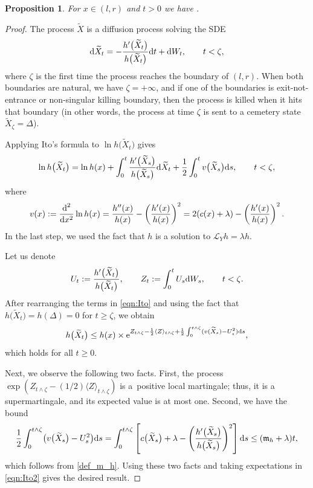\documentclass[pdftex]{sigma}
\numberwithin{equation}{section}
\newtheorem{Proposition}[Theorem]{Proposition}
\theoremstyle{definition}
\def\L{{\mathcal L}}
\def\e{{\mathbb E}}
\def\d{{\textnormal d}}
\begin{document}
\begin{Proposition}\label{prop_excessive}
For $x\in (l,r)$ and $t>0$ we have \smash{$\e_x\big[ h\bigl(\widetilde X_t\bigr)\big] \le {\rm e}^{ ({\mathfrak m}_h + \lambda) t} h(x) $}.
\end{Proposition}
\begin{proof}
The process $\widetilde X$ is a diffusion process solving the SDE
\[
\d \widetilde X_t=-\frac{h'\bigl(\widetilde X_t\bigr)}{h\bigl(\widetilde X_t\bigr)} \d t + \d W_t, \qquad t<\zeta,
\]
where $\zeta$ is the first time the process reaches the boundary of $(l,r)$. When both boundaries are natural, we have $\zeta=+\infty$, and if one of the boundaries is exit-not-entrance or non-singular killing boundary, then the process is killed when it hits that boundary \big(in other words, the process at time $\zeta$ is sent to a cemetery state $\widetilde X_{\zeta}=\Delta$\big).

Applying Ito's formula to $\ln h\bigl(\widetilde X_t\bigr)$ gives
\begin{equation}\label{eqn:Ito}
\ln h\bigl(\widetilde X_t\bigr)=\ln h (x) +
\int_0^t \frac{h'\bigl(\widetilde X_s\bigr)}{h\bigl(\widetilde X_s\bigr)} \d \widetilde X_t
+\frac{1}{2} \int_0^t v\bigl(\widetilde X_s\bigr) \d s, \qquad t<\zeta,
\end{equation}
where
\[
v(x):=\frac{\d^2}{\d x^2} \ln h(x)=\frac{h''(x)}{h(x)}-\left(\frac{h'(x)}{h(x)}\right)^2=2(c(x)+\lambda)-\left(\frac{h'(x)}{h(x)}\right)^2.
\]
In the last step, we used the fact that $h$ is a solution to $\L_Y h=\lambda h$.

Let us denote
\[
U_t:=\frac{h'\bigl(\widetilde X_t\bigr)}{h\bigl(\widetilde X_t\bigr)}, \qquad Z_t:=\int_0^{t} U_s  \d W_s, \qquad t<\zeta.
\]
After rearranging the terms in \eqref{eqn:Ito} and using the fact that $h\bigl(\widetilde X_{t}\bigr)=h(\Delta)=0$ for $t\ge \zeta$, we obtain
\begin{equation}\label{eqn:Ito2}
h\bigl(\widetilde X_t\bigr) \le h(x) \times {\rm e}^{ Z_{t\wedge \zeta} - \frac{1}{2} \langle Z \rangle_{t\wedge \zeta} + \frac{1}{2} \int_0^{t\wedge \zeta} (v(\widetilde X_s) - U_s^2)\d s},
\end{equation}
which holds for all $t\ge 0$.

Next, we observe the following two facts. First, the process $\exp( Z_{t\wedge \zeta} - (1/2)\langle Z \rangle_{t\wedge \zeta})$ is a~positive local martingale; thus, it is a supermartingale, and its expected value is at most one. Second, we have the bound
\[
\frac{1}{2} \int_0^{t\wedge \zeta} \bigl(v\bigl(\widetilde X_s\bigr) - U_s^2\bigr) \d s =
\int_0^{t\wedge \zeta} \left[ c\bigl(\widetilde X_s\bigr) + \lambda - \left( \frac{h'\bigl(\widetilde X_s\bigr)}{h\bigl(\widetilde X_s\bigr)}\right)^2 \right] \d s \le ({\mathfrak m}_h+\lambda) t,
\]
which follows from \eqref{def_m_h}. Using these two facts and taking expectations in \eqref{eqn:Ito2} gives the desired result.
\end{proof}
\end{document}
